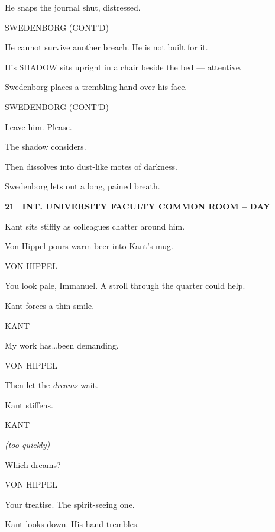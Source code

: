 \documentclass[12pt]{article}
\newcommand{\scene}[2]{%
  \vspace{1.8\baselineskip}%
  \noindent\textbf{#1 \ #2}\par\vspace{0.4\baselineskip}%
}
\newenvironment{dialogue}[1]{%
  \vspace{0.8\baselineskip}%
  \noindent\hspace*{2.3in}\textsc{#1}\par%
  \noindent\hspace*{1.5in}\begin{minipage}[t]{4.5in}%
}{%
  \end{minipage}\par%
}
\newcommand{\paren}[1]{%
  \noindent\hspace*{1.8in}\textit{(#1)}\par%
}
\begin{document}
He snaps the journal shut, distressed.

\begin{dialogue}{SWEDENBORG (CONT'D)}
He cannot survive another breach. He is not built for it.
\end{dialogue}

His SHADOW sits upright in a chair beside the bed — attentive.

Swedenborg places a trembling hand over his face.

\begin{dialogue}{SWEDENBORG (CONT'D)}
Leave him. Please.
\end{dialogue}

The shadow considers.

Then dissolves into dust-like motes of darkness.

Swedenborg lets out a long, pained breath.


\scene{21}{INT. UNIVERSITY FACULTY COMMON ROOM -- DAY}

Kant sits stiffly as colleagues chatter around him.

Von Hippel pours warm beer into Kant’s mug.

\begin{dialogue}{VON HIPPEL}
You look pale, Immanuel. A stroll through the quarter could help.
\end{dialogue}

Kant forces a thin smile.

\begin{dialogue}{KANT}
My work has\ldots been demanding.
\end{dialogue}

\begin{dialogue}{VON HIPPEL}
Then let the \emph{dreams} wait.
\end{dialogue}

Kant stiffens.

\begin{dialogue}{KANT}
\paren{too quickly}
Which dreams?
\end{dialogue}

\begin{dialogue}{VON HIPPEL}
Your treatise. The spirit-seeing one.
\end{dialogue}

Kant looks down. His hand trembles.
\end{document}

